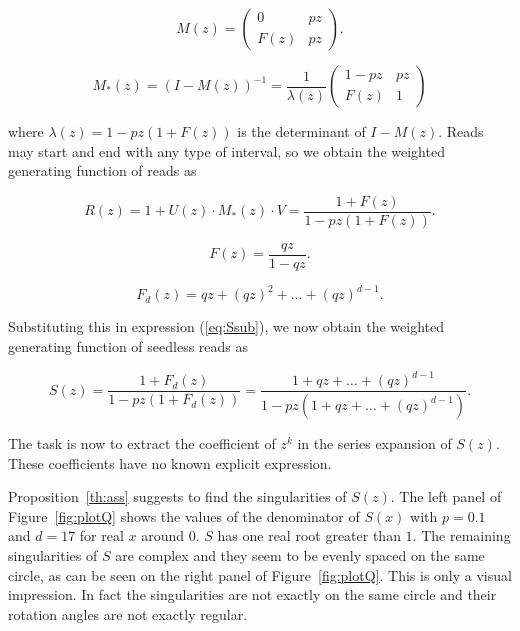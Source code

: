 \documentclass{article}
\begin{document}
\begin{equation*}
M(z) = \left(
\begin{matrix}
0    & pz \\
F(z) & pz
\end{matrix}
\right).
\end{equation*}

\begin{equation*}
M_*(z) = (I-M(z))^{-1}=
\frac{1}{\lambda(z)}
\left(
\begin{matrix}
1-pz & pz   \\
F(z) & 1
\end{matrix}
\right)
\end{equation*}

\noindent
where $\lambda(z) = 1-pz(1+F(z))$ is the determinant of $I-M(z)$.
Reads may start and end with any type of interval, so we obtain the
weighted generating function of reads as

\begin{equation}
\label{eq:Ssub}
R(z) = 1 + U(z) \cdot M_*(z) \cdot V = 
\frac{1+F(z)}{1-pz(1+F(z))}.
\end{equation}

\begin{equation*}
F(z) = \frac{qz}{1-qz}.
\end{equation*}


\begin{equation*}
F_d(z) = qz + (qz)^2 + \ldots + (qz)^{d-1}.
\end{equation*}

Substituting this in expression (\ref{eq:Ssub}), we now obtain the
weighted generating function of seedless reads as

\begin{equation}
\label{eq:Sp}
S(z) = \frac{1+F_d(z)}{1-pz(1+F_d(z))} =
\frac{1+qz + \ldots + (qz)^{d-1}}{1-pz(1+qz + \ldots +
(qz)^{d-1})}.
\end{equation}

The task is now to extract the coefficient of $z^k$ in the series
expansion of $S(z)$. These coefficients have no known explicit expression.

Proposition~\ref{th:ass} suggests to find the singularities of $S(z)$. The
left panel of Figure~\ref{fig:plotQ} shows the values of the denominator
of $S(x)$ with $p=0.1$ and $d=17$ for real $x$ around $0$. $S$ has one
real root greater than $1$.  The remaining singularities of $S$ are
complex and they seem to be evenly spaced on the same circle, as can be
seen on the right panel of Figure~\ref{fig:plotQ}. This is only a visual
impression. In fact the singularities are not exactly on the same circle
and their rotation angles are not exactly regular.
\end{document}
